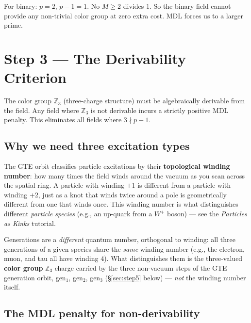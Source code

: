 \documentclass[11pt,a4paper]{article}
\newcommand{\term}[1]{\textbf{#1}}
\theoremstyle{definition}
\begin{document}
\medskip
For binary: $p = 2$, $p - 1 = 1$.  No $M \geq 2$ divides 1.  So the binary
field cannot provide any non-trivial color group at zero extra cost.
MDL forces us to a larger prime.

\section{Step 3 — The Derivability Criterion}
\label{sec:step3}

\begin{tcolorbox}[colback=boxblue,colframe=blue!40!black,
  title={Step~3 claim}]
The color group $\mathbb{Z}_3$ (three-charge structure) must be algebraically
derivable from the field.  Any field where $\mathbb{Z}_3$ is not derivable
incurs a strictly positive MDL penalty.  This eliminates all fields where
$3 \nmid p-1$.
\end{tcolorbox}

\subsection{Why we need three excitation types}

The GTE orbit classifies particle excitations by their \term{topological
winding number}: how many times the field winds around the vacuum as you
scan across the spatial ring.  A particle with winding $+1$ is different
from a particle with winding $+2$, just as a knot that winds twice around
a pole is geometrically different from one that winds once.  This winding
number is what distinguishes different \emph{particle species} (e.g., an
up-quark from a $W^+$ boson) --- see the \emph{Particles as Kinks} tutorial.

Generations are a \emph{different} quantum number, orthogonal to winding:
all three generations of a given species share the \emph{same} winding
number (e.g., the electron, muon, and tau all have winding $4$).  What
distinguishes them is the three-valued \term{color group} $\mathbb{Z}_3$
charge carried by the three non-vacuum steps of the GTE generation orbit,
gen$_1$, gen$_2$, gen$_3$ (\S\ref{sec:step5} below) --- \emph{not} the
winding number itself.

\subsection{The MDL penalty for non-derivability}
\end{document}
